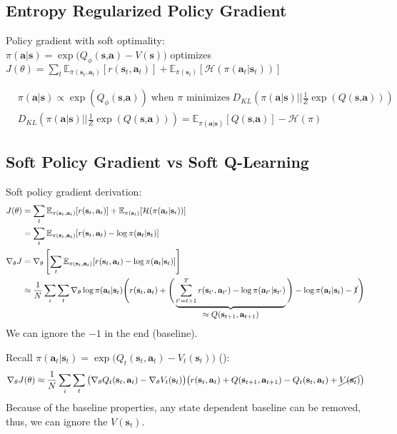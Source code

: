 \subsection{Entropy Regularized Policy Gradient}
Policy gradient with soft optimality:\\
$\pi(\textbf{a}|\textbf{s}) = \exp \big( Q_\phi(\textbf{s,a}) - V(\textbf{s}) \big)$ optimizes $J(\theta) = \sum_t \mathbb{E}_{\pi(\textbf{s}_t, \textbf{a}_t)} [r(\textbf{s}_t, \textbf{a}_t)] + \mathbb{E}_{\pi(\textbf{s}_t)} [\mathcal{H}(\pi(\textbf{a}_t | \textbf{s}_t))]$

\begin{align*}
	&\pi(\textbf{a}|\textbf{s}) \propto \exp ( Q_\phi(\textbf{s,a})) \;\text{when $\pi$ minimizes}\; D_{KL} \left( \pi(\textbf{a}|\textbf{s}) \Big|\Big| \frac{1}{Z} \exp (Q(\textbf{s,a}))\right) \\
	&D_{KL} \left( \pi(\textbf{a}|\textbf{s}) \Big|\Big| \frac{1}{Z} \exp (Q(\textbf{s,a}))\right) = \mathbb{E}_{\pi(\textbf{a|s})} [Q(\textbf{s,a})] -\mathcal{H}(\pi)
\end{align*}

\subsection{Soft Policy Gradient vs Soft Q-Learning}
Soft policy gradient derivation:
\begin{align}
	J(\theta) &= \sum_t \mathbb{E}_{\pi(\textbf{s}_t, \textbf{a}_t)} [r(\textbf{s}_t, \textbf{a}_t)] + \mathbb{E}_{\pi(\textbf{s}_t)} [\mathcal{H}(\pi(\textbf{a}_t | \textbf{s}_t))]\\
	&= \sum_t \mathbb{E}_{\pi(\textbf{s}_t, \textbf{a}_t)} [r(\textbf{s}_t, \textbf{a}_t) - \log \pi(\textbf{a}_t | \textbf{s}_t)]\\
	\nabla_\theta J &= \nabla_\theta \left[ \sum_t \mathbb{E}_{\pi(\textbf{s}_t, \textbf{a}_t)} [r(\textbf{s}_t, \textbf{a}_t) - \log \pi(\textbf{a}_t | \textbf{s}_t)] \right]\\
	&\approx \frac{1}{N} \sum_i \sum_t \nabla_\theta \log \pi(\textbf{a}_t | \textbf{s}_t) \Bigg( r(\textbf{s}_t, \textbf{a}_t) + \Bigg(\underbrace{\sum_{t'=t+1}^T r(\textbf{s}_{t'}, \textbf{a}_{t'}) - \log \pi(\textbf{a}_{t'} | \textbf{s}_{t'})}_{\textstyle \approx Q(\textbf{s}_{t+1}, \textbf{a}_{t+1})} \Bigg) - \log\pi(\textbf{a}_t | \textbf{s}_t) - \cancel{1} \Bigg)
\end{align}
We can ignore the $-1$ in the end (baseline).

Recall $\pi(\textbf{a}_t | \textbf{s}_t) = \exp \big(Q_t(\textbf{s}_t, \textbf{a}_t) - V_t(\textbf{s}_t)\big)$ (): 
\begin{equation}
	\nabla_\theta J(\theta) \approx \frac{1}{N} \sum_i \sum_t \big( \nabla_\theta Q_t(\textbf{s}_t, \textbf{a}_t) - \nabla_\theta V_t(\textbf{s}_t) \big) \big( r(\textbf{s}_t, \textbf{a}_t) + Q(\textbf{s}_{t+1}, \textbf{a}_{t+1}) - Q_t(\textbf{s}_t, \textbf{a}_t) + \cancel{V(\textbf{s}_t)} \big)
\end{equation}
Because of the baseline properties, any state dependent baseline can be removed, thus, we can ignore the $V(\textbf{s}_t)$.

